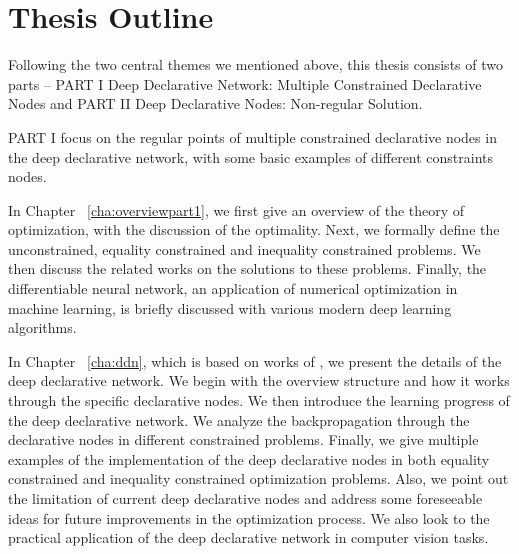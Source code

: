 \section{Thesis Outline}
\label{sec:outline}
Following the two central themes we mentioned above, this thesis consists of two parts -- PART I Deep Declarative Network: Multiple Constrained Declarative Nodes and PART II Deep Declarative Nodes: Non-regular Solution. 
\par PART I focus on the regular points of multiple constrained declarative nodes in the deep declarative network, with some basic examples of different constraints nodes. 
\begin{description}
    \item In Chapter ~\ref{cha:overviewpart1}, we first give an overview of the theory of optimization, with the discussion of the optimality. Next, we formally define the unconstrained, equality constrained and inequality constrained problems. We then discuss the related works on the solutions to these problems. Finally, the differentiable neural network, an application of numerical optimization in machine learning, is briefly discussed with various modern deep learning algorithms.  
    \item In Chapter ~\ref{cha:ddn}, which is based on works of \cite{SG:19}, we present the details of the deep declarative network. We begin with the overview structure and how it works through the specific declarative nodes. We then introduce the learning progress of the deep declarative network. We analyze the backpropagation through the declarative nodes in different constrained problems. Finally, we give multiple examples of the implementation of the deep declarative nodes in both equality constrained and inequality constrained optimization problems. Also, we point out the limitation of current deep declarative nodes and address some foreseeable ideas for future improvements in the optimization process. We also look to the practical application of the deep declarative network in computer vision tasks.
\end{description}

